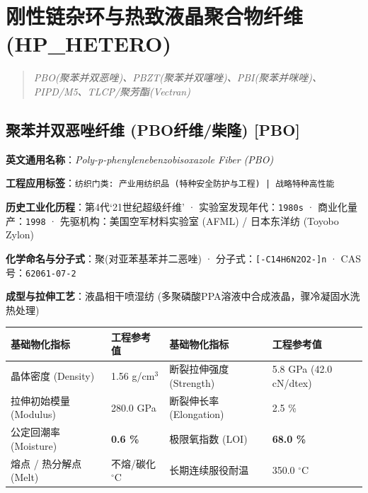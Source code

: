 \documentclass[11pt,openright,twoside,UTF8]{ctexbook}
\begin{document}
\chapter{刚性链杂环与热致液晶聚合物纤维 (HP\_HETERO)}
\begin{quote}
\small\itshape
PBO(聚苯并双恶唑)、PBZT(聚苯并双噻唑)、PBI(聚苯并咪唑)、PIPD/M5、TLCP/聚芳酯(Vectran)
\end{quote}

\section{聚苯并双恶唑纤维 (PBO纤维/柴隆) [PBO]}
\label{sec:pbo}

\noindent\textbf{英文通用名称}：\textit{Poly-p-phenylenebenzobisoxazole Fiber (PBO)}\par
\noindent\textbf{工程应用标签}：\texttt{纺织门类: 产业用纺织品 (特种安全防护与工程) | 战略特种高性能}\par
\noindent\textbf{历史工业化历程}：第4代‘21世纪超级纤维’ · 实验室发现年代：\texttt{1980s} · 商业化量产：\texttt{1998} · 先驱机构：美国空军材料实验室 (AFML) / 日本东洋纺 (Toyobo Zylon)\par
\noindent\textbf{化学命名与分子式}：聚(对亚苯基苯并二恶唑) · 分子式：\texttt{[-C14H6N2O2-]n} · CAS 号：\texttt{62061-07-2}\par
\noindent\textbf{成型与拉伸工艺}：液晶相干喷湿纺 (多聚磷酸PPA溶液中合成液晶，骤冷凝固水洗热处理)\par

\vspace{0.15cm}
\begin{center}
\small
\begin{tabularx}{\textwidth}{p{3.8cm}Xp{3.8cm}X}
\toprule
\textbf{基础物化指标} & \textbf{工程参考值} & \textbf{基础物化指标} & \textbf{工程参考值} \\
\midrule
晶体密度 (Density) & 1.56 g/cm$^3$ & 断裂拉伸强度 (Strength) & 5.8 GPa (42.0 cN/dtex) \\
拉伸初始模量 (Modulus) & 280.0 GPa & 断裂伸长率 (Elongation) & 2.5 \% \\
公定回潮率 (Moisture) & \textbf{0.6 \%} & 极限氧指数 (LOI) & \textbf{68.0 \%} \\
熔点 / 热分解点 (Melt) & 不熔/碳化 $^\circ\mathrm{C}$ & 长期连续服役耐温 & 350.0 $^\circ\mathrm{C}$ \\
\bottomrule
\end{tabularx}
\end{center}
\vspace{0.15cm}
\end{document}
